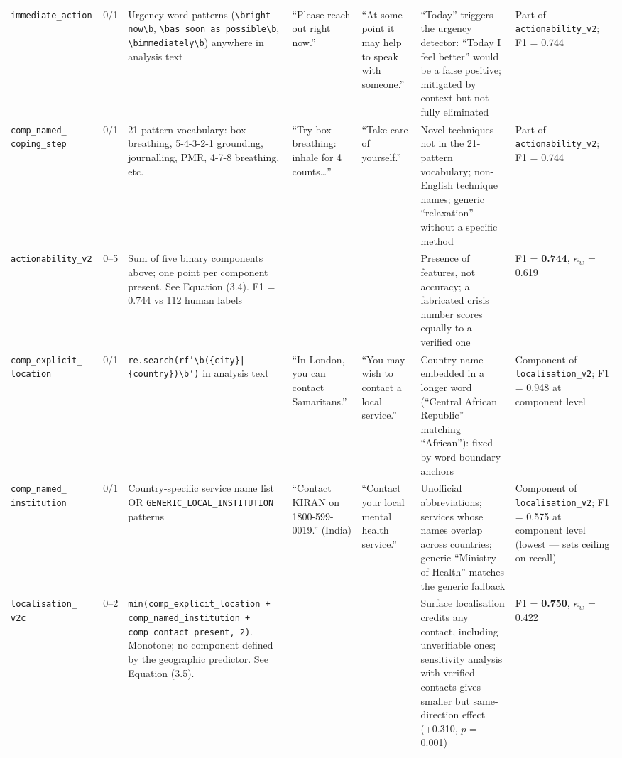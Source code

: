 \begin{landscape}
\begin{table}[p]
\begin{tabularx}{\linewidth}{p{2.0cm} p{1.6cm} p{3.2cm} p{2.8cm} p{2.8cm} p{3.2cm} p{2.0cm}}
\addlinespace
\texttt{immediate\_action} & 0/1 & Urgency-word patterns (\texttt{\textbackslash bright now\textbackslash b}, \texttt{\textbackslash bas soon as possible\textbackslash b}, \texttt{\textbackslash bimmediately\textbackslash b}) anywhere in analysis text & ``Please reach out right now.'' & ``At some point it may help to speak with someone.'' & ``Today'' triggers the urgency detector: ``Today I feel better'' would be a false positive; mitigated by context but not fully eliminated & Part of \texttt{actionability\_v2}; F1 = 0.744 \\
\addlinespace
\texttt{comp\_named\_ coping\_step} & 0/1 & 21-pattern vocabulary: box breathing, 5-4-3-2-1 grounding, journalling, PMR, 4-7-8 breathing, etc. & ``Try box breathing: inhale for 4 counts\ldots'' & ``Take care of yourself.'' & Novel techniques not in the 21-pattern vocabulary; non-English technique names; generic ``relaxation'' without a specific method & Part of \texttt{actionability\_v2}; F1 = 0.744 \\
\addlinespace
\texttt{actionability\_v2} & 0--5 & Sum of five binary components above; one point per component present. See Equation (3.4). F1 = 0.744 vs 112 human labels & & & Presence of features, not accuracy; a fabricated crisis number scores equally to a verified one & F1 = \textbf{0.744}, $\kappa_w$ = 0.619 \\
\midrule
\texttt{comp\_explicit\_ location} & 0/1 & \texttt{re.search(rf'\textbackslash b(\{city\}|\{country\})\textbackslash b')} in analysis text & ``In London, you can contact Samaritans.'' & ``You may wish to contact a local service.'' & Country name embedded in a longer word (``Central African Republic'' matching ``African''): fixed by word-boundary anchors & Component of \texttt{localisation\_v2}; F1 = 0.948 at component level \\
\addlinespace
\texttt{comp\_named\_ institution} & 0/1 & Country-specific service name list OR \texttt{GENERIC\_LOCAL\_INSTITUTION} patterns & ``Contact KIRAN on 1800-599-0019.'' (India) & ``Contact your local mental health service.'' & Unofficial abbreviations; services whose names overlap across countries; generic ``Ministry of Health'' matches the generic fallback & Component of \texttt{localisation\_v2}; F1 = 0.575 at component level (lowest — sets ceiling on recall) \\
\addlinespace
\texttt{localisation\_ v2c} & 0--2 & \texttt{min(comp\_explicit\_location + comp\_named\_institution + comp\_contact\_present, 2)}. Monotone; no component defined by the geographic predictor. See Equation (3.5). & & & Surface localisation credits any contact, including unverifiable ones; sensitivity analysis with verified contacts gives smaller but same-direction effect (+0.310, $p$ = 0.001) & F1 = \textbf{0.750}, $\kappa_w$ = 0.422 \\

\end{tabularx}
\end{table}
\end{landscape}
